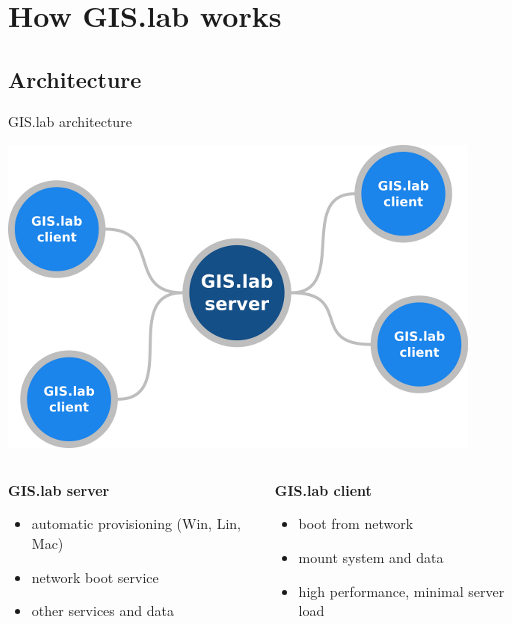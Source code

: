 \documentclass[12pt]{beamer}
\begin{document}
\section{How GIS.lab works}
\subsection{Architecture}
\begin{frame}{GIS.lab architecture}
	\begin{center}
		\includegraphics[keepaspectratio=true,height=0.4\textheight]{images/gislab-architecture.png}
	\end{center}
	\begin{columns}
		\begin{column}{0.5\textwidth}
			\textbf{GIS.lab server}
			\begin{itemize}
				\item automatic provisioning (Win, Lin, Mac)
				\item network boot service
				\item other services and data
			\end{itemize}				
    	\end{column}
		\begin{column}{0.5\textwidth}
			\textbf{GIS.lab client}
			\begin{itemize}
				\item boot from network
				\item mount system and data
				\item high performance, minimal server load
			\end{itemize}
		\end{column}
	\end{columns}	
\end{frame}
\end{document}
